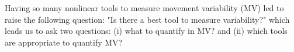 %
%
%


Having so many nonlinear tools to measure movement variability (MV) 
led \citealt[p. 67]{caballero2014} to raise the following question: 
"Is there a best tool to measure variability?" which leads us to ask
two questions: (i) what to quantify in MV? 
and (ii) which tools are appropriate to quantify MV?

